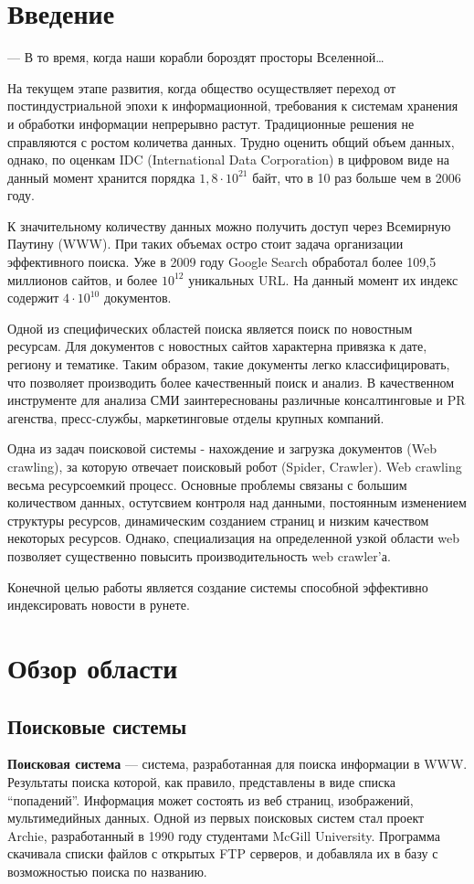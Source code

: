 \chapter*{Введение}
\epigraph{— В то время, когда наши корабли бороздят просторы
Вселенной…}{} На текущем этапе развития, когда общество осуществляет переход от
постиндустриальной эпохи к информационной, требования к системам хранения и
обработки информации непрерывно растут. Традиционные решения не справляются с
ростом количетва данных. Трудно оценить общий объем данных, однако, по оценкам
IDC (International Data Corporation) в цифровом виде на данный момент хранится порядка
$1,8\cdot10^{21}$ байт, что в 10 раз больше чем в 2006 году.

К значительному количеству данных можно получить доступ через Всемирную Паутину
(WWW). При таких объемах остро стоит задача организации эффективного поиска. Уже
в 2009 году Google Search обработал более 109,5 миллионов сайтов, и более
$10^{12}$ уникальных URL. На данный момент их индекс содержит $4\cdot10^{10}$ документов.

Одной из специфических областей поиска является поиск по новостным ресурсам.
 Для документов с новостных сайтов характерна привязка к дате, региону и тематике.
 Таким образом, такие документы легко классифицировать, что позволяет производить более качественный поиск и анализ.
 В качественном инструменте для анализа СМИ заинтереснованы различные консалтинговые и PR агенства, пресс-службы, маркетинговые отделы крупных компаний.

Одна из задач поисковой системы - нахождение и загрузка документов (Web crawling), за которую отвечает поисковый робот (Spider, Crawler).
 Web crawling весьма ресурсоемкий процесс. Основные проблемы связаны с большим количеством данных,
 остутсвием  контроля над данными, постоянным изменением структуры ресурсов, динамическим созданием страниц и низким качеством некоторых ресурсов.
 Однако, специализация на определенной узкой области web позволяет существенно повысить производительность web crawler'а.

Конечной целью работы является создание системы способной эффективно индексировать новости в рунете.

\chapter{Обзор области}
\section{Поисковые системы}
\textbf{Поисковая система} --- система, разработанная для
поиска информации в WWW. Результаты поиска которой, как правило, представлены в
виде списка ``попадений''. Информация может состоять из веб страниц,  изображений,
мультимедийных данных. Одной из первых поисковых систем стал
проект Archie, разработанный в 1990 году студентами McGill University. Программа скачивала
списки файлов с открытых FTP серверов, и добавляла их в базу с возможностью
поиска по названию. %

